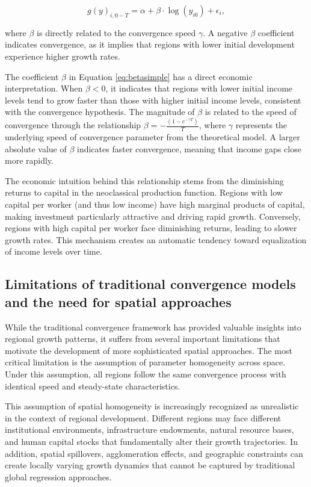 \documentclass[smallextended, natbib]{svjour3}       %
\begin{document}
\begin{equation}
g(y)_{i,0-T} = \alpha + \beta \cdot \log(y_{i0}) + \epsilon_{i},
\label{eq:betasimple}
\end{equation}

\noindent where $\beta$ is directly related to the convergence speed $\gamma$. 
A negative $\beta$ coefficient indicates convergence, as it implies that regions with lower initial development experience higher growth rates.

The coefficient $\beta$ in Equation \ref{eq:betasimple} has a direct economic interpretation. 
When $\beta < 0$, it indicates that regions with lower initial income levels tend to grow faster than those with higher initial income levels, consistent with the convergence hypothesis. 
The magnitude of $\beta$ is related to the speed of convergence through the relationship $\beta = -\frac{(1 - e^{-\gamma T})}{T}$, where $\gamma$ represents the underlying speed of convergence parameter from the theoretical model. 
A larger absolute value of $\beta$ indicates faster convergence, meaning that income gaps close more rapidly.

The economic intuition behind this relationship stems from the diminishing returns to capital in the neoclassical production function. 
Regions with low capital per worker (and thus low income) have high marginal products of capital, making investment particularly attractive and driving rapid growth. 
Conversely, regions with high capital per worker face diminishing returns, leading to slower growth rates. 
This mechanism creates an automatic tendency toward equalization of income levels over time.

\subsection{Limitations of traditional convergence models and the need for spatial approaches}

While the traditional convergence framework has provided valuable insights into regional growth patterns, it suffers from several important limitations that motivate the development of more sophisticated spatial approaches.
The most critical limitation is the assumption of parameter homogeneity across space.
Under this assumption, all regions follow the same convergence process with identical speed and steady-state characteristics.

This assumption of spatial homogeneity is increasingly recognized as unrealistic in the context of regional development. 
Different regions may face different institutional environments, infrastructure endowments, natural resource bases, and human capital stocks that fundamentally alter their growth trajectories. 
In addition, spatial spillovers, agglomeration effects, and geographic constraints can create locally varying growth dynamics that cannot be captured by traditional global regression approaches.
\end{document}
